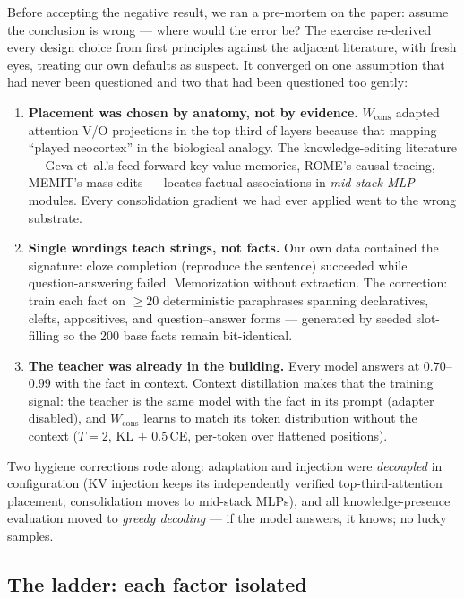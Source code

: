 \documentclass[11pt]{article}
\begin{document}
Before accepting the negative result, we ran a pre-mortem on the paper: assume the conclusion is
wrong --- where would the error be? The exercise re-derived every design choice from first
principles against the adjacent literature, with fresh eyes, treating our own defaults as suspect.
It converged on one assumption that had never been questioned and two that had been questioned too
gently:

\begin{enumerate}
\item \textbf{Placement was chosen by anatomy, not by evidence.} $W_{\mathrm{cons}}$ adapted
      attention V/O projections in the top third of layers because that mapping ``played
      neocortex'' in the biological analogy. The knowledge-editing literature --- Geva et~al.'s
      feed-forward key-value memories, ROME's causal tracing, MEMIT's mass edits --- locates
      factual associations in \emph{mid-stack MLP} modules. Every consolidation gradient we had
      ever applied went to the wrong substrate.
\item \textbf{Single wordings teach strings, not facts.} Our own data contained the signature:
      cloze completion (reproduce the sentence) succeeded while question-answering failed.
      Memorization without extraction. The correction: train each fact on $\geq 20$ deterministic
      paraphrases spanning declaratives, clefts, appositives, and question--answer forms ---
      generated by seeded slot-filling so the 200 base facts remain bit-identical.
\item \textbf{The teacher was already in the building.} Every model answers at $0.70$--$0.99$
      with the fact in context. Context distillation makes that the training signal: the teacher
      is the same model with the fact in its prompt (adapter disabled), and $W_{\mathrm{cons}}$
      learns to match its token distribution without the context
      ($T = 2$, KL $+$ $0.5\,$CE, per-token over flattened positions).
\end{enumerate}

Two hygiene corrections rode along: adaptation and injection were \emph{decoupled} in
configuration (KV injection keeps its independently verified top-third-attention placement;
consolidation moves to mid-stack MLPs), and all knowledge-presence evaluation moved to
\emph{greedy decoding} --- if the model answers, it knows; no lucky samples.

\subsection{The ladder: each factor isolated}
\end{document}
